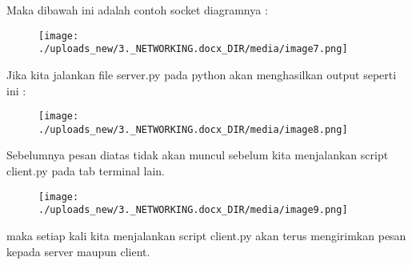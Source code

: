 \documentclass{wileySix}
\begin{document}
Maka dibawah ini adalah contoh socket diagramnya : \par
\begin{center}
	
	
	
	\begin{figure}[H]
		\begin{center}
			\texttt{[image: ./uploads\_new/3.\_NETWORKING.docx\_DIR/media/image7.png]}
		\end{center}
	\end{figure}
	
	
	
	
\end{center}\vspace{12pt}
Jika kita jalankan file server.py pada python akan menghasilkan output seperti ini : \par
\begin{center}
	
	
	
	\begin{figure}[H]
		\begin{center}
			\texttt{[image: ./uploads\_new/3.\_NETWORKING.docx\_DIR/media/image8.png]}
		\end{center}
	\end{figure}
	
	
	
	
\end{center}\vspace{12pt}
Sebelumnya pesan diatas tidak akan muncul sebelum kita menjalankan script client.py pada tab terminal lain. \par
\begin{center}
	
	
	
	\begin{figure}[H]
		\begin{center}
			\texttt{[image: ./uploads\_new/3.\_NETWORKING.docx\_DIR/media/image9.png]}
		\end{center}
	\end{figure}
	
	
	
	
\end{center}\vspace{12pt}
maka setiap kali kita menjalankan script client.py akan terus mengirimkan pesan kepada server maupun client. \par
\noindent 
\vspace{12pt}
\end{document}
